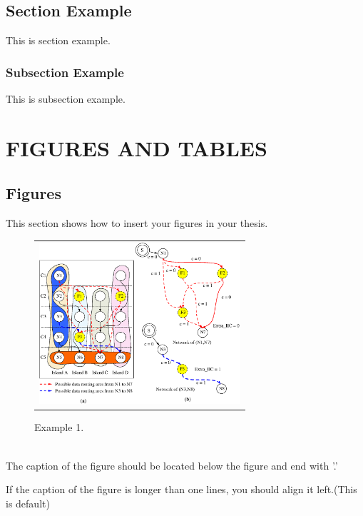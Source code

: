 \documentclass[doctor]{snuee}
\begin{document}
\section{Section Example}
This is section example.
\subsection{Subsection Example}
This is subsection example.

\chapter{FIGURES AND TABLES}
\section{Figures}
This section shows how to insert your figures in your thesis.\\
\begin{figure}[htbp]
	{
		\begin{center}
			\begin{tabular}{c}
				\includegraphics[height=6cm]{Sample.eps}
			\end{tabular}
		\end{center}
	}
	\caption{Example 1.}
\end{figure}\\
The caption of the figure should be located below the figure and end with '.'

\newpage
If the caption of the figure is longer than one lines, you should
align it left.(This is default)\\
\end{document}
